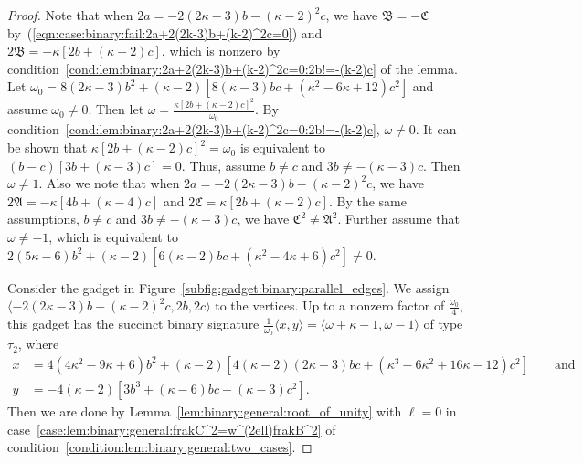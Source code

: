 \documentclass[11pt]{article}
\begin{document}
\begin{proof}
 Note that when $2 a = -2 (2 \kappa - 3) b - (\kappa - 2)^2 c$,
 we have $\mathfrak{B} = -\mathfrak{C}$ by~(\ref{eqn:case:binary:fail:2a+2(2k-3)b+(k-2)^2c=0})
 and $2 \mathfrak{B} = -\kappa [2 b + (\kappa - 2) c]$,
 which is nonzero by condition~\ref{cond:lem:binary:2a+2(2k-3)b+(k-2)^2c=0:2b!=-(k-2)c} of the lemma.
 Let $\omega_0 = 8 (2 \kappa - 3) b^2 + (\kappa - 2) \left[8 (\kappa - 3) b c + (\kappa^2 - 6 \kappa + 12) c^2\right]$
 and assume $\omega_0 \ne 0$.
 Then let $\omega = \frac{\kappa [2 b + (\kappa - 2) c]^2}{\omega_0}$.
 By condition~\ref{cond:lem:binary:2a+2(2k-3)b+(k-2)^2c=0:2b!=-(k-2)c},
 $\omega \ne 0$.
 It can be shown that $\kappa [2 b + (\kappa - 2) c]^2 = \omega_0$ is equivalent to $(b - c) [3 b + (\kappa - 3) c] = 0$.
 Thus, assume $b \ne c$ and $3 b \ne -(\kappa - 3) c$.
 Then $\omega \ne 1$.
 Also we note that when $2 a = -2 (2 \kappa - 3) b - (\kappa - 2)^2 c$,
 we have $2 \mathfrak{A} = -\kappa [4 b + (\kappa - 4) c]$ and $2 \mathfrak{C} = \kappa [2 b + (\kappa - 2) c]$.
 By the same assumptions,
 $b \ne c$ and $3 b \ne -(\kappa - 3) c$,
 we have $\mathfrak{C}^2 \ne \mathfrak{A}^2$.
 Further assume that $\omega \ne -1$,
 which is equivalent to $2 (5 \kappa - 6) b^2 + (\kappa - 2) [6 (\kappa - 2) b c + (\kappa^2 - 4 \kappa + 6) c^2] \ne 0$.
 
 Consider the gadget in Figure~\ref{subfig:gadget:binary:parallel_edges}.
 We assign $\langle -2 (2 \kappa - 3) b - (\kappa - 2)^2 c, 2 b, 2 c \rangle$ to the vertices.
 Up to a nonzero factor of $\frac{\omega_0}{4}$,
 this gadget has the succinct binary signature $\frac{1}{\omega_0} \langle x, y \rangle = \langle \omega + \kappa - 1, \omega - 1 \rangle$ of type $\tau_2$,
 where
 \begin{align*}
  x &= 4 (4 \kappa^2 - 9 \kappa + 6) b^2 + (\kappa - 2) \left[4 (\kappa - 2) (2 \kappa - 3) b c + (\kappa^3 - 6 \kappa^2 + 16 \kappa - 12) c^2\right]
  \qquad \text{and}\\
  y &= -4 (\kappa - 2) \left[3 b^3 + (\kappa - 6) b c - (\kappa - 3) c^2\right].
 \end{align*}
 Then we are done by Lemma~\ref{lem:binary:general:root_of_unity} with $\ell = 0$
 in case~\ref{case:lem:binary:general:frakC^2=w^(2ell)frakB^2} of condition~\ref{condition:lem:binary:general:two_cases}.
 

\end{proof}
\end{document}
